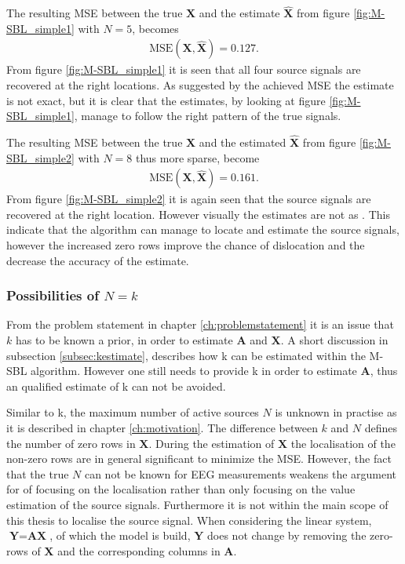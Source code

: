 \noindent
The resulting MSE between the true $\mathbf{X}$ and the estimate $\hat{\mathbf{X}}$ from figure \ref{fig:M-SBL_simple1} with $N = 5$, becomes 
\begin{align*}
\text{MSE}(\mathbf{X}, \hat{\mathbf{X}}) = 0.127.
\end{align*}
From figure \ref{fig:M-SBL_simple1} it is seen that all four source signals are recovered at the right locations. 
As suggested by the achieved MSE the estimate is not exact, but it is clear that the estimates, by looking at figure \ref{fig:M-SBL_simple1}, manage to follow the right pattern of the true signals. 

The resulting MSE between the true $\mathbf{X}$ and the estimated $\hat{\mathbf{X}}$ from figure \ref{fig:M-SBL_simple2} with $N = 8$ thus more sparse, become 
\begin{align*}
\text{MSE}(\mathbf{X}, \hat{\mathbf{X}}) = 0.161. 
\end{align*}
From figure \ref{fig:M-SBL_simple2} it is again seen that the source signals are recovered at the right location. However visually the estimates are not as .  
This indicate that the algorithm can manage to locate and estimate the source signals, however the increased zero rows improve the chance of dislocation and the decrease the accuracy of the estimate.     

\subsubsection*{Possibilities of $N=k$}

From the problem statement in chapter \ref{ch:problemstatement} it is an issue that $k$ has to be known a prior, in order to estimate $\textbf{A}$ and $\textbf{X}$. A short discussion in subsection \ref{subsec:kestimate}, describes how k can be estimated within the M-SBL algorithm. However one still needs to provide k in order to estimate $\textbf{A}$, thus an qualified estimate of k can not be avoided. 

Similar to k, the maximum number of active sources $N$ is unknown in practise as it is described in chapter \ref{ch:motivation}. 
The difference between $k$ and $N$ defines the number of zero rows in $\textbf{X}$.
During the estimation of $\textbf{X}$ the localisation of the non-zero rows are in general significant to minimize the MSE. However, the fact that the true $N$ can not be known for EEG measurements weakens the argument for of focusing on the localisation rather than only focusing on the value estimation of the source signals. Furthermore it is not within the main scope of this thesis to localise the source signal.  
When considering the linear system, $\textbf{Y}=\textbf{AX}$, of which the model is build, $\textbf{Y}$ does not change by removing the zero-rows of $\textbf{X}$ and the corresponding columns in $\textbf{A}$.
 
